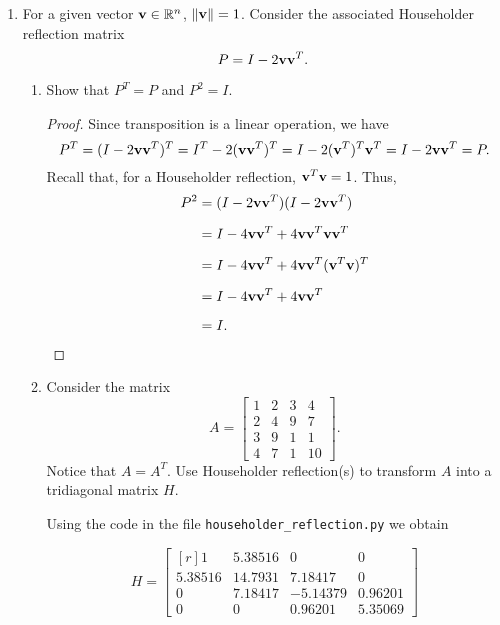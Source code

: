 \documentclass[11pt,oneside,english,reqno]{amsart}
\theoremstyle{definition}
\newcommand{\MB}[1]{\mathbb{#1}}
\newcommand{\1}{\mathbbm{1}}
\begin{document}
\begin{enumerate}[leftmargin=*]
\vfill
\pagebreak

\item For a given vector ${\bf v}\in\MB{R}^n$, $\|{\bf v}\|=1$. Consider the associated Householder reflection matrix 
\begin{equation}
P=I-2{\bf vv}^T.
\end{equation}

\begin{enumerate}
\item Show that $P^T=P$ and $P^2=I$.

\begin{proof}
Since transposition is a linear operation, we have
\begin{equation}
P^T=(I-2{\bf vv}^T)^T=I^T-2({\bf vv}^T)^T=I-2({\bf v}^T)^T{\bf v}^T=I-2{\bf vv}^T=P.
\end{equation}
Recall that, for a Householder reflection, ${\bf v}^T{\bf v}=1$. Thus,
\begin{align*}
P^2&=(I-2{\bf vv}^T)(I-2{\bf vv}^T)\\[2mm]
&=I-4{\bf vv}^T+4{\bf vv}^T{\bf vv}^T\\[2mm]
&=I-4{\bf vv}^T+4{\bf vv}^T({\bf v}^T{\bf v})^T\\[2mm]
&=I-4{\bf vv}^T+4{\bf vv}^T\\[2mm]
&=I.\qedhere
\end{align*}
\end{proof}

\item Consider the matrix
\begin{equation}\label{4b1}
A=\begin{bmatrix}1 & 2 & 3 & 4 \\ 2 & 4 & 9 & 7 \\ 3 & 9 & 1 & 1 \\ 4 & 7 & 1 & 10\end{bmatrix}.
\end{equation}
Notice that $A=A^T$. Use Householder reflection(s) to transform $A$ into a tridiagonal matrix $H$.

Using the code in the file \verb!householder_reflection.py! we obtain 

\begin{equation}
H=\begin{bmatrix*}[r] 1 & 5.38516  & 0 &      0 \\[2mm]
5.38516 & 14.7931  & 7.18417 & 0\\[2mm]
0 &       7.18417 & -5.14379  & 0.96201\\[2mm]
 0 &      0 &       0.96201 & 5.35069\end{bmatrix*}
\end{equation}


\end{enumerate}
\end{enumerate}
\end{document}
